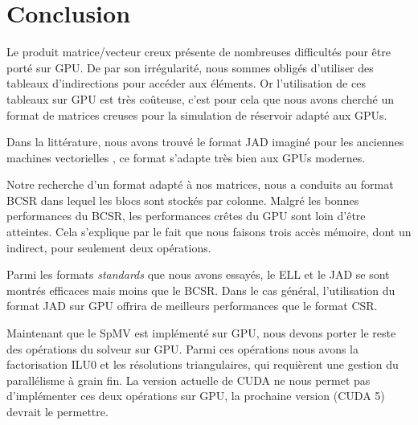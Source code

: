 \documentclass[renpar]{compas2013}
\begin{document}
\section{Conclusion}
 Le produit matrice/vecteur creux présente de nombreuses difficultés
 pour être porté sur GPU. De par son irrégularité, nous sommes
 obligés d'utiliser des tableaux d'indirections pour accéder aux
 éléments. Or l'utilisation de ces tableaux sur GPU est très coûteuse,
 c'est pour cela que nous avons cherché un format de matrices creuses 
 pour la simulation de réservoir adapté aux GPUs.

 Dans la littérature, nous avons trouvé le format JAD imaginé pour les
 anciennes machines vectorielles \cite{Blelloch93segmentedoperations},
 ce format s'adapte très bien aux GPUs modernes.
 
 Notre recherche d'un format adapté à nos matrices, nous
 a conduits au format BCSR dans lequel les blocs sont stockés par
 colonne. Malgré les bonnes performances du BCSR, les performances
 crêtes du GPU sont loin d'être atteintes. Cela s'explique par le fait
 que nous faisons trois accès mémoire, dont un indirect, pour seulement deux
 opérations.

 Parmi les formats \textit{standards} que nous
 avons essayés, le ELL et le JAD se sont montrés efficaces mais moins
 que le BCSR. Dans le cas général, l'utilisation du format JAD 
 sur GPU  offrira de meilleurs performances que le format CSR.

 Maintenant que le SpMV est implémenté sur GPU, nous devons porter le
 reste des opérations du solveur sur GPU. Parmi ces opérations nous avons
 la factorisation ILU0 et les résolutions triangulaires, qui requièrent
 une gestion du parallélisme à grain fin. La version actuelle de CUDA
 ne nous permet pas d'implémenter ces deux opérations sur GPU, la 
 prochaine version (CUDA 5) devrait le permettre.


\end{document}
